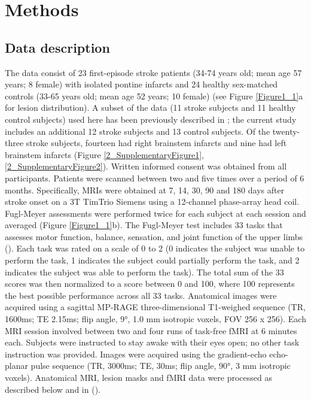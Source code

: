\documentclass[phd,tocprelim]{cornell}
\begin{document}
\section{Methods}
	\subsection{Data description}
	 The data consist of 23 first-episode stroke patients (34-74 years old; mean age 57 years; 8 female) with isolated pontine infarcts and 24 healthy sex-matched controls (33-65 years old; mean age 52 years; 10 female) (see Figure \ref{Figure1_1}a for lesion distribution). A subset of the data (11 stroke subjects and 11 healthy control subjects) used here has been previously described in \cite{Lu2011-ow}; the current study includes an additional 12 stroke subjects and 13 control subjects. Of the twenty-three stroke subjects, fourteen had right brainstem infarcts and nine had left brainstem infarcts (Figure \ref{2_SupplementaryFigure1}, \ref{2_SupplementaryFigure2}). Written informed consent was obtained from all participants. Patients were scanned between two and five times over a period of 6 months. Specifically, MRIs were obtained at 7, 14, 30, 90 and 180 days after stroke onset on a 3T TimTrio Siemens using a 12-channel phase-array head coil. Fugl-Meyer assessments were performed twice for each subject at each session and averaged (Figure \ref{Figure1_1}b). The Fugl-Meyer test includes 33 tasks that assesses motor function, balance, sensation, and joint function of the upper limbs (\cite{Fugl-Meyer1975-nh}). Each task was rated on a scale of 0 to 2 (0 indicates the subject was unable to perform the task, 1 indicates the subject could partially perform the task, and 2 indicates the subject was able to perform the task). The total sum of the 33 scores was then normalized to a score between 0 and 100, where 100 represents the best possible performance across all 33 tasks. Anatomical images were acquired using a sagittal MP-RAGE three-dimensional T1-weighed sequence (TR, 1600ms; TE 2.15ms; flip angle, 9°, 1.0 mm isotropic voxels, FOV 256 x 256). Each MRI session involved between two and four runs of task-free fMRI at 6 minutes each. Subjects were instructed to stay awake with their eyes open; no other task instruction was provided. Images were acquired using the gradient-echo echo-planar pulse sequence (TR, 3000ms; TE, 30ms; flip angle, 90°, 3 mm isotropic voxels). Anatomical MRI, lesion masks and fMRI data were processed as described below and in (\cite{Olafson2021-qt}).
	 
\end{document}
